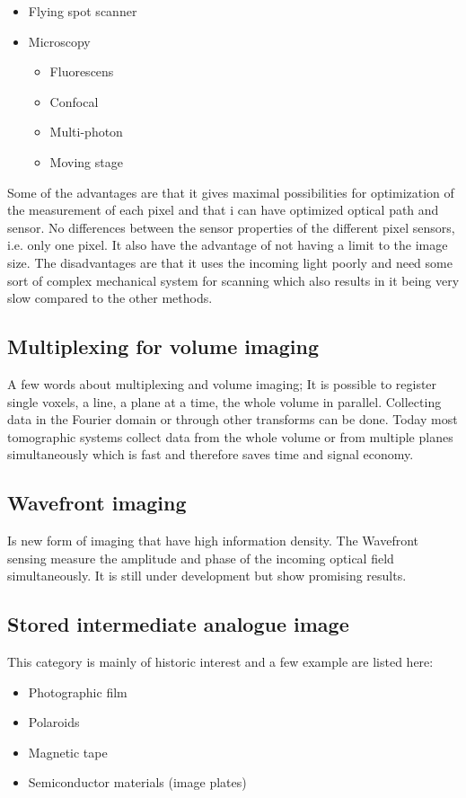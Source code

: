 \begin{itemize}
	\item Flying spot scanner
	\item Microscopy
	\begin{itemize}
		\item Fluorescens
		\item Confocal
		\item Multi-photon
		\item Moving stage
	\end{itemize}
\end{itemize}

Some of the advantages are that it gives maximal possibilities for optimization of the measurement of each pixel and that i can have optimized optical path and sensor. No differences between the sensor properties of the different pixel sensors, i.e. only one pixel. It also have the advantage of not having a limit to the image size. The disadvantages are that it uses the incoming light poorly and need some sort of complex mechanical system for scanning which also results in it being very slow compared to the other methods. 

\subsection{Multiplexing for volume imaging}
A few words about multiplexing and volume imaging; It is possible to register single voxels, a line, a plane at a time, the whole volume in parallel. Collecting data in the Fourier domain or through other transforms can be done. Today most tomographic systems collect data from the whole volume or from multiple planes simultaneously which is fast and therefore saves time and signal economy. 

\subsection{Wavefront imaging}
Is new form of imaging that have high information density. The Wavefront sensing measure the amplitude and phase of the incoming optical field simultaneously. It is still under development but show promising results. 

\subsection{Stored intermediate analogue image}
This category is mainly of historic interest and a few example are listed here:

\begin{itemize}
	\item Photographic film
	\item Polaroids
	\item Magnetic tape 
	\item Semiconductor materials (image plates)
\end{itemize}




